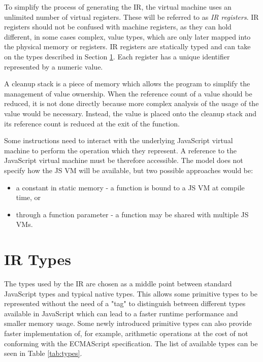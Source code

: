 To simplify the process of generating the IR, the virtual machine uses an unlimited number of virtual registers. These will be referred to as \textit{IR registers}. IR registers should not be confused with machine registers, as they can hold different, in some cases complex, value types, which are only later mapped into the physical memory or registers. IR registers are statically typed and can take on the types described in Section \ref{ir:types}. Each register has a unique identifier represented by a numeric value.

A cleanup stack is a piece of memory which allows the program to simplify the management of value ownership. When the reference count of a value should be reduced, it is not done directly because more complex analysis of the usage of the value would be necessary. Instead, the value is placed onto the cleanup stack and its reference count is reduced at the exit of the function.

Some instructions need to interact with the underlying JavaScript virtual machine to perform the operation which they represent. A reference to the JavaScript virtual machine must be therefore accessible. The model does not specify how the JS VM will be available, but two possible approaches would be:
\begin{itemize}
    \item a constant in static memory - a function is bound to a JS VM at compile time, or
    \item through a function parameter - a function may be shared with multiple JS VMs.
\end{itemize}


\section{IR Types}\label{ir:types}

The types used by the IR are chosen as a middle point between standard JavaScript types and typical native types. This allows some primitive types to be represented without the need of a "tag" to distinguish between different types available in JavaScript which can lead to a faster runtime performance and smaller memory usage. Some newly introduced primitive types can also provide faster implementation of, for example, arithmetic operations at the cost of not conforming with the ECMAScript specification. The list of available types can be seen in Table \ref{tab:types}.


